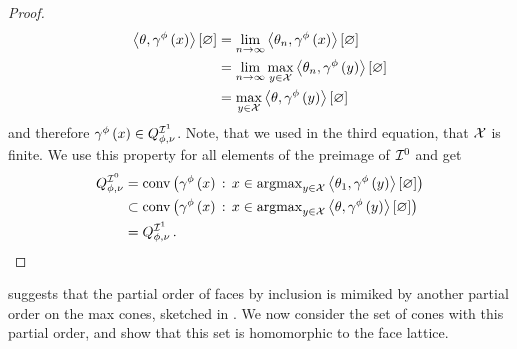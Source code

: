 \begin{proof}
\begin{align*}
            \left\langle \theta,\gamma^{\phi}\left(x\right)\right\rangle \left[ \varnothing \right]
            &= \lim_{n\rightarrow\infty} \left\langle \theta_{n},\gamma^{\phi}\left(x\right)\right\rangle \left[ \varnothing \right] \\
            &= \lim_{n\rightarrow\infty} \max_{y\in\mathcal{X}} \left\langle \theta_{n},\gamma^{\phi}\left(y\right)\right\rangle \left[ \varnothing \right] \\
            &= \max_{y\in\mathcal{X}} \left\langle \theta,\gamma^{\phi}\left(y\right)\right\rangle \left[ \varnothing \right]
        \end{align*}
        and therefore $\gamma^{\phi}\left(x\right)\in Q^{\mathcal{I}^{1}}_{\phi,\nu}$.
        Note, that we used in the third equation, that $\mathcal{X}$ is finite.%
        We use this property for all elements of the preimage of $\mathcal{I}^{0}$ and get
        \begin{align*}
            Q^{\mathcal{I}^{0}}_{\phi,\nu}
            &= \mathrm{conv}\left(\gamma^{\phi}\left(x\right)\,:\,x\in\mathrm{argmax}_{y\in\mathcal{X}}\left\langle \theta_{1},\gamma^{\phi}\left(y\right)\right\rangle \left[ \varnothing \right]\right) \\
            &\subset \mathrm{conv}\left(\gamma^{\phi}\left(x\right)\,:\,x\in\mathrm{argmax}_{y\in\mathcal{X}}\left\langle \theta,\gamma^{\phi}\left(y\right)\right\rangle \left[ \varnothing \right]\right) \\
            &= Q^{\mathcal{I}^{1}}_{\phi,\nu} \, .
        \end{align*}
\end{proof}

 suggests that the partial order of faces by inclusion is mimiked by another partial order on the max cones, sketched in .
We now consider the set of cones with this partial order, and show that this set is homomorphic to the face lattice.

